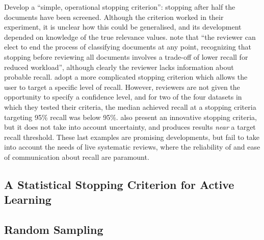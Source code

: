 \documentclass{bmcart}
\begin{document}
\cite{Wallace2010a} Develop a ``simple, operational stopping criterion'': stopping after half the documents have been screened. Although the criterion worked in their experiment, it is unclear how this could be generalised, and its development depended on knowledge of the true relevance values. 
\cite{Jonnalagadda2013} note that ``the reviewer can elect to end the process of classifying documents at any point, recognizing that stopping before reviewing all documents involves a trade-off of lower recall for reduced workload'', although clearly the reviewer lacks information about probable recall.
\cite{Yu2019} adopt a more complicated stopping criterion which allows the user to target a specific level of recall. However, reviewers are not given the opportunity to specify a confidence level, and for two of the four datasets in which they tested their criteria, the median achieved recall at a stopping criteria targeting 95\% recall was below 95\%. \cite{DiNunzio2018} also present an innovative stopping criteria, but it does not take into account uncertainty, and produces results \textit{near} a target recall threshold. 
These last examples are promising developments, but fail to take into account the needs of live systematic reviews, where the reliability of and ease of communication about recall are paramount.


\subsection*{A Statistical Stopping Criterion for Active Learning}

	\subsection*{Random Sampling}
\end{document}

